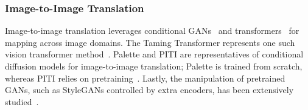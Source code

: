 \subsubsection{Image-to-Image Translation}
Image-to-image translation leverages conditional GANs~\cite{isola2018imagetoimagetranslationconditionaladversarial, wang2018highresolutionimagesynthesissemantic, zhou2021cocosnetv2fullresolutioncorrespondence, zhu2018multimodalimagetoimagetranslation} 
and transformers~\cite{chen2021pretrainedimageprocessingtransformer,ramesh2021zeroshottexttoimagegeneration} 
for mapping across image domains. The Taming Transformer represents one such vision 
transformer method~\cite{esser2021tamingtransformershighresolutionimage}. Palette and PITI are 
representatives of conditional diffusion models for image-to-image translation; Palette is 
trained from scratch, whereas PITI relies on pretraining~\cite{saharia2022paletteimagetoimagediffusionmodels, wang2022pretrainingneedimagetoimagetranslation}. 
Lastly, the manipulation of pretrained GANs, such as StyleGANs controlled by extra encoders, has been 
extensively studied~\cite{richardson2021encodingstylestyleganencoder}.
